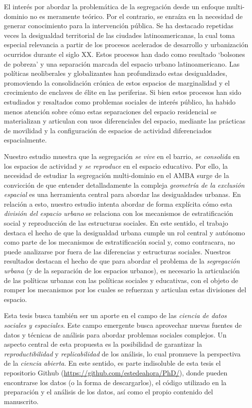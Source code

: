 \documentclass[
  spanish,
  a4paper,%
  chapterprefix=true,%
  DIV=calc,%
  twoside]{scrbook}%
\begin{document}
El interés por abordar la problemática de la segregación desde un enfoque multi-dominio no es meramente teórico. Por el contrario, se enraíza en la necesidad de generar conocimiento para la intervención pública. Se ha destacado repetidas veces la desigualdad territorial de las ciudades latinoamericanas, la cual toma especial relevancia a partir de los procesos acelerados de desarrollo y urbanización ocurridos durante el siglo XX. Estos procesos han dado como resultado `bolsones de pobreza' y una separación marcada del espacio urbano latinoamericano. Las políticas neoliberales y globalizantes han profundizado estas desigualdades, promoviendo la consolidación crónica de estos espacios de marginalidad y el crecimiento de enclaves de élite en las periferias. Si bien estos procesos han sido estudiados y resaltados como problemas sociales de interés público, ha habido menos atención sobre cómo estas separaciones del espacio residencial se materializan y articulan con usos diferenciales del espacio, mediante las prácticas de movilidad y la configuración de espacios de actividad diferenciados espacialmente.

Nuestro estudio muestra que la segregación \emph{se vive} en el barrio, \emph{se consolida} en los espacios de actividad y \emph{se reproduce} en el espacio educativo. Por ello, la necesidad de estudiar la segregación multi-dominio en el AMBA surge de la convicción de que entender detalladamente la compleja \emph{geometría de la exclusión espacial} es una herramienta central para abordar las desigualdades urbanas. En relación a esto, nuestro estudio intenta abordar de forma explícita cómo esta \emph{división del espacio urbano} se relaciona con los mecanismos de estratificación social y reproducción de las estructuras sociales. En este sentido, el trabajo destaca el hecho de que la desigualdad urbana cumple un rol central y autónomo como parte de los mecanismos de estratificación social y, como contracara, no puede analizarse por fuera de las diferencias y estructuras sociales. Nuestros resultados destacan el hecho de que para abordar el problema de la \emph{segregación urbana} (y de la separación de los espacios urbanos), es necesario la articulación de las políticas urbanas con las políticas sociales y educativas, con el objeto de romper los mecanismos por los cuales se refuerzan y articulan estas divisiones del espacio.

Esta tesis busca también ser un aporte en el campo de las \emph{ciencia de datos sociales y espaciales}. Este campo emergente busca aprovechar nuevas fuentes de datos y técnicas de análisis para abordar problemas sociales complejos. Un aspecto central de esta propuesta es la posibilidad de garantizar la \emph{reproductibilidad} y \emph{replicabilidad} de los análisis, lo cual promueve la perspectiva de la \emph{ciencia abierta}. En este sentido, es parte indisoluble de esta tesis el repositorio Github (\url{https://github.com/estedeahora/PhD/}), donde pueden encontrarse los datos (o la forma de descargarlos), el código utilizado en la preparación y el análisis de los datos, así como el propio contenido del manuscrito.
\end{document}
